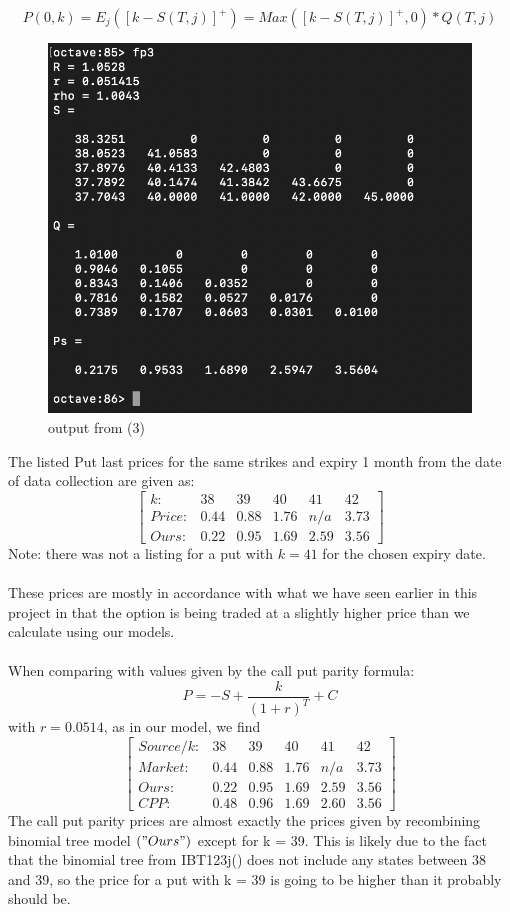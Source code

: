 \documentclass{article}
\begin{document}
$$P(0,k) =E_j([k - S(T,j)]^+) = Max([k - S(T,j)]^+, 0) * Q(T,j)$$
\FloatBarrier
\begin{figure}
    \centering
    \includegraphics[width=0.8\linewidth]{part3out.png}
    \caption{output from (3)}
    \label{IV comparison of bs (top) vs crr(bottom)}
\end{figure}
\FloatBarrier
The listed Put last prices for the same strikes and expiry 1 month from the date of data collection are given as:
$$
\begin{bmatrix}
    k: & 38 & 39 & 40 & 41 & 42\\
    Price: & 0.44 & 0.88 & 1.76 & n/a & 3.73\\
    Ours: & 0.22 & 0.95 & 1.69 & 2.59 & 3.56
    
\end{bmatrix}
$$
Note: there was not a listing for a put with $k = 41$ for the chosen expiry date.\\
\\
\hspace*{0.5cm}These prices are mostly in accordance with what we have seen earlier in this project in that the option is being traded at a slightly higher price than we calculate using our models.
\\
\\
When comparing with values given by the call put parity formula:
$$
P = -S + \frac{k}{(1+r)^T} + C
$$
with $r = 0.0514$, as in our model, we find \\
$$
\begin{bmatrix}
    Source/k: & 38 & 39 & 40 & 41 & 42\\
    Market: & 0.44 & 0.88 & 1.76 & n/a & 3.73\\
    Ours: & 0.22 & 0.95 & 1.69 & 2.59 & 3.56\\
    CPP: & 0.48 & 0.96 & 1.69 & 2.60 & 3.56
\end{bmatrix}
$$
\hspace*{0.5cm}The call put parity prices are almost exactly the prices given by recombining binomial tree model $("Ours")$ except for k = 39. This is likely due to the fact that the binomial tree from IBT123j() does not include any states between 38 and 39, so the price for a put with k = 39 is going to be higher than it probably should be.
\newpage
\appendix
\end{document}
